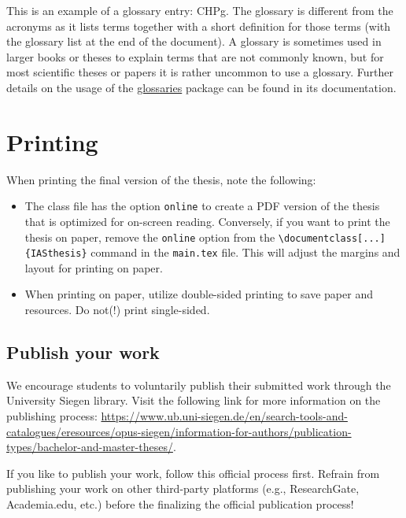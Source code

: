 This is an example of a glossary entry: \gls{CHPg}. The glossary is different from the acronyms as it lists terms together with a short definition for those terms (with the glossary list at the end of the document). A glossary is sometimes used in larger books or theses to explain terms that are not commonly known, but for most scientific theses or papers it is rather uncommon to use a glossary. Further details on the usage of the \href{https://ctan.org/pkg/glossaries}{glossaries} package can be found in its documentation.

\section{Printing}
When printing the final version of the thesis, note the following:
\begin{itemize}
	\item The class file has the option \verb|online| to create a PDF version of the thesis that is optimized for on-screen reading. Conversely, if you want to print the thesis on paper, remove the \verb|online| option from the \verb|\documentclass[...]{IASthesis}| command in the \texttt{main.tex} file. This will adjust the margins and layout for printing on paper.
	\item When printing on paper, utilize double-sided printing to save paper and resources. Do not(!) print single-sided.
\end{itemize}

\subsection{Publish your work}
\label{sec:publish}
We encourage students to voluntarily publish their submitted work through the University Siegen library. Visit the following link for more information on the publishing process: \href{https://www.ub.uni-siegen.de/en/search-tools-and-catalogues/eresources/opus-siegen/information-for-authors/publication-types/bachelor-and-master-theses/}{https://www.ub.uni-siegen.de/en/search-tools-and-catalogues/eresources/opus-siegen/information-for-authors/publication-types/bachelor-and-master-theses/}.

If you like to publish your work, follow this official process first. Refrain from publishing your work on other third-party platforms (e.g., ResearchGate, Academia.edu, etc.) before the finalizing the official publication process! 